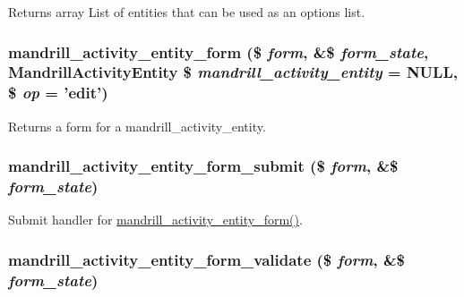 \begin{DoxyReturn}{Returns}
array List of entities that can be used as an options list. 
\end{DoxyReturn}
\hypertarget{mandrill__activity_8admin_8inc_a8cddf760b276121f239c2ef5022372d1}{
\subsubsection[{mandrill\_\-activity\_\-entity\_\-form}]{\setlength{\rightskip}{0pt plus 5cm}mandrill\_\-activity\_\-entity\_\-form (\$ {\em form}, \/  \&\$ {\em form\_\-state}, \/  {\bf MandrillActivityEntity} \$ {\em mandrill\_\-activity\_\-entity} = {\ttfamily NULL}, \/  \$ {\em op} = {\ttfamily 'edit'})}}
\label{mandrill__activity_8admin_8inc_a8cddf760b276121f239c2ef5022372d1}
Returns a form for a mandrill\_\-activity\_\-entity. \hypertarget{mandrill__activity_8admin_8inc_a93e709e127ee25c795a65fcbe13448f0}{
\subsubsection[{mandrill\_\-activity\_\-entity\_\-form\_\-submit}]{\setlength{\rightskip}{0pt plus 5cm}mandrill\_\-activity\_\-entity\_\-form\_\-submit (\$ {\em form}, \/  \&\$ {\em form\_\-state})}}
\label{mandrill__activity_8admin_8inc_a93e709e127ee25c795a65fcbe13448f0}
Submit handler for \hyperlink{mandrill__activity_8admin_8inc_a8cddf760b276121f239c2ef5022372d1}{mandrill\_\-activity\_\-entity\_\-form()}. \hypertarget{mandrill__activity_8admin_8inc_afb6aafdfef05226643d5a437488945db}{
\subsubsection[{mandrill\_\-activity\_\-entity\_\-form\_\-validate}]{\setlength{\rightskip}{0pt plus 5cm}mandrill\_\-activity\_\-entity\_\-form\_\-validate (\$ {\em form}, \/  \&\$ {\em form\_\-state})}}
